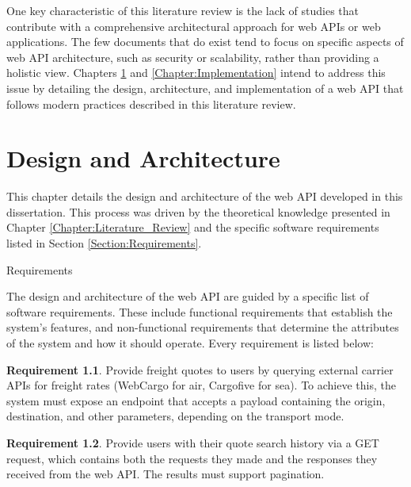\documentclass[12pt, reqno]{amsbook}
\makeatletter
\def\section{\@startsection{section}{1}%
      \z@{.5\linespacing\@plus.7\linespacing}{.25\linespacing}%
      {\normalfont\bfseries\flushleft}}
\theoremstyle{definition}
\theoremstyle{definition}
\newtheorem{requirement}{Requirement}
\numberwithin{section}{chapter}
\numberwithin{table}{chapter}
\numberwithin{figure}{chapter}
\makeatother
\begin{document}
One key characteristic of this literature review is the lack of studies that contribute with a comprehensive architectural approach for web \acp{API} or web applications. The few documents that do exist tend to focus on specific aspects of web \ac{API} architecture, such as security or scalability, rather than providing a holistic view. Chapters \ref{Chapter:Design_And_Architecture} and \ref{Chapter:Implementation} intend to address this issue by detailing the design, architecture, and implementation of a web \ac{API} that follows modern practices described in this literature review.

\chapter{Design and Architecture}
\label{Chapter:Design_And_Architecture}

This chapter details the design and architecture of the web \ac{API} developed in this dissertation. This process was driven by the theoretical knowledge presented in Chapter \ref{Chapter:Literature_Review} and the specific software requirements listed in Section \ref{Section:Requirements}.

\section{Requirements}
\label{Section:Requirements}

The design and architecture of the web \ac{API} are guided by a specific list of software requirements. These include functional requirements that establish the system's features, and non-functional requirements that determine the attributes of the system and how it should operate. Every requirement is listed below:

\begin{requirement}
  \label{Requirement:1}
  Provide freight quotes to users by querying external carrier \acp{API} for freight rates (WebCargo for air, Cargofive for sea). To achieve this, the system must expose an endpoint that accepts a payload containing the origin, destination, and other parameters, depending on the transport mode.
\end{requirement}

\begin{requirement}
  \label{Requirement:2}
  Provide users with their quote search history via a GET request, which contains both the requests they made and the responses they received from the web \ac{API}. The results must support pagination.
\end{requirement}
\end{document}

